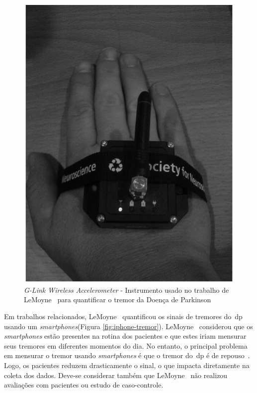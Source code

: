 \begin{figure}
 \centering
 \includegraphics[scale=0.3]{./img/quantif-parkinson.png}
\caption[\textit{G-Link Wireless Accelerometer} - Instrumento usado no trabalho de LeMoyne para quantificar o tremor da Doença de Parkinson]{\textit{G-Link Wireless Accelerometer} - Instrumento usado no trabalho de LeMoyne~\cite{LeMoyne2009} para quantificar o tremor da Doença de Parkinson} 
 \label{fig:quantif-parkinson}
\end{figure}


Em trabalhos relacionados, LeMoyne~\cite{lemoyne2010} quantificou os sinais de tremores do~\ac{dp} usando um \textit{smartphones}(Figura \ref{fig:iphone-tremor}). LeMoyne~\cite{lemoyne2010} considerou que os \textit{smartphones} estão presentes na rotina dos pacientes e que estes iriam mensurar seus tremores em diferentes momentos do dia. No entanto, o principal problema em mensurar o tremor usando \textit{smartphones} é que o tremor do~\ac{dp} é de repouso~\cite{jankovic2008}. Logo, os pacientes reduzem drasticamente o sinal, o que impacta diretamente na coleta dos dados. Deve-se considerar também que LeMoyne~\cite{lemoyne2010} não realizou avaliações com pacientes ou estudo de caso-controle. 

